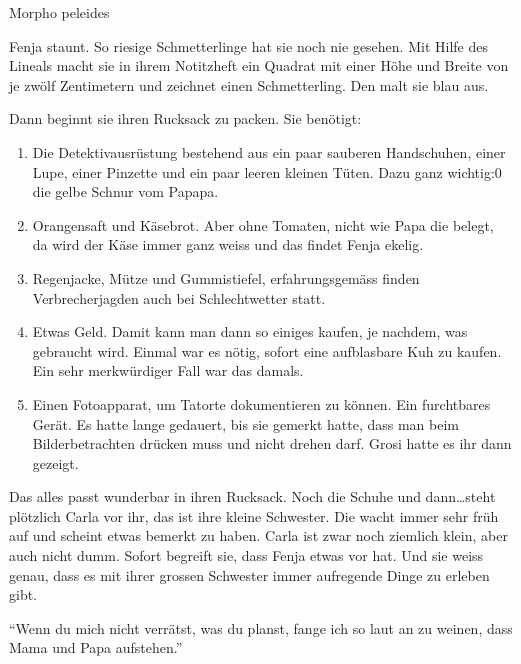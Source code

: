 \begin{description}
	\item[Morpho peleides] 
\end{description}

Fenja staunt. So riesige Schmetterlinge hat sie noch nie gesehen. Mit Hilfe des Lineals macht sie in ihrem Notitzheft ein Quadrat mit einer Höhe und Breite von je zwölf Zentimetern und zeichnet einen Schmetterling. Den malt sie blau aus.

Dann beginnt sie ihren Rucksack zu packen. Sie benötigt:

\begin{enumerate}
  \item Die Detektivausrüstung bestehend aus ein paar sauberen Handschuhen, einer Lupe, einer Pinzette und ein paar leeren kleinen Tüten. Dazu ganz wichtig:0 die gelbe Schnur vom Papapa.
  \item Orangensaft und Käsebrot. Aber ohne Tomaten, nicht wie Papa die belegt, da wird der Käse immer ganz weiss und das findet Fenja ekelig.
  \item Regenjacke, Mütze und Gummistiefel, erfahrungsgemäss finden Verbrecherjagden auch bei Schlechtwetter statt.
  \item Etwas Geld. Damit kann man dann so einiges kaufen, je nachdem, was gebraucht wird. Einmal war es nötig, sofort eine aufblasbare Kuh zu kaufen. Ein sehr merkwürdiger Fall war das damals.
  \item Einen Fotoapparat, um Tatorte dokumentieren zu können. Ein furchtbares Gerät. Es hatte lange gedauert, bis sie gemerkt hatte, dass man beim Bilderbetrachten drücken muss und nicht drehen darf. Grosi hatte es ihr dann gezeigt.
\end{enumerate}

Das alles passt wunderbar in ihren Rucksack. Noch die Schuhe und dann\dots steht plötzlich Carla vor ihr, das ist ihre kleine Schwester. Die wacht immer sehr früh auf und scheint etwas bemerkt zu haben. Carla ist zwar noch ziemlich klein, aber auch nicht dumm. Sofort begreift sie, dass Fenja etwas vor hat. Und sie weiss genau, dass es mit ihrer grossen Schwester immer aufregende Dinge zu erleben gibt.

\enquote{Wenn du mich nicht verrätst, was du planst, fange ich so laut an zu weinen, dass Mama und Papa aufstehen.}

